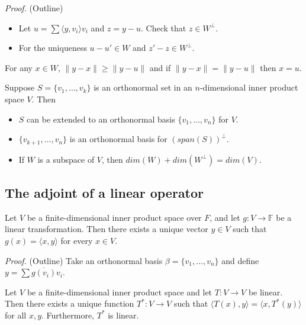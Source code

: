 \documentclass[12pt]{article}
\newenvironment{theorem}[2][Theorem]{\begin{trivlist}
\item[\hskip \labelsep {\bfseries #1}\hskip \labelsep {\bfseries #2.}]}{\end{trivlist}}
\newenvironment{corollary}[2][Corollary]{\begin{trivlist}
\item[\hskip \labelsep {\bfseries #1}\hskip \labelsep {\bfseries #2}]}{\end{trivlist}}
\begin{document}
\textit{Proof.} (Outline)

\begin{itemize}
    \item Let $u = \sum \langle y, v_i \rangle v_i$ and $z = y - u$. Check that $z \in W^\perp$.
    
    \item For the uniqueness $u - u' \in W$ and $z' - z \in W^\perp$.
\end{itemize}

\begin{corollary}{9}
For any $x \in W$, $\lVert y - x \rVert \geq \lVert y - u \rVert$ and if $\lVert y - x \rVert = \lVert y - u \rVert$ then $x = u$.
\end{corollary}

\begin{theorem}{6.7}
Suppose $S = \{v_1, \dots, v_k\}$ is an orthonormal set in an $n$-dimensional inner product space $V$. Then 

\begin{itemize}
    \item[(a)] $S$ can be extended to an orthonormal basis $\{v_1, \dots, v_n\}$ for $V$.
    
    \item[(b)] $\{v_{k+1}, \dots, v_n\}$ is an orthonormal basis for $(span(S))^\perp$.
    
    \item[(c)] If $W$ is a subspace of $V$, then $dim(W) + dim(W^\perp) = dim(V)$.
\end{itemize}
\end{theorem}

\subsection{The adjoint of a linear operator}

\begin{theorem}{6.8}
Let $V$ be a finite-dimensional inner product space over $F$, and let $g : V \to \mathbb{F}$ be a linear transformation. Then there exists a unique vector $y \in V$ such that $g(x) = \langle x, y \rangle$ for every $x \in V$.
\end{theorem}

\textit{Proof.} (Outline) Take an orthonormal basis $\beta = \{v_1, \dots, v_n\}$ and define $y = \sum \overline{g(v_i)}v_i$.

\begin{theorem}{6.9}
Let $V$ be a finite-dimensional inner product space and let $T : V \to V$ be linear. Then there exists a unique function $T^* : V \to V$ such that $\langle T(x), y \rangle = \langle x, T^*(y) \rangle$ for all $x,y$. Furthermore, $T^*$ is linear.
\end{theorem}
\end{document}
